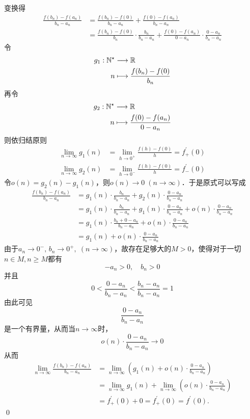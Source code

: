 \prove 变换得
\begin{align}
    \frac{f(b_n)-f(a_n)}{b_n-a_n} &= \frac{f(b_n)-f(0)}{b_n-a_n}+\frac{f(0)-f(a_n)}{b_n-a_n} \\
    &= \frac{f(b_n)-f(0)}{b_n} \cdot \frac{b_n}{b_n - a_n} + \frac{f(0)-f(a_n)}{0 - a_n} \cdot \frac{0 - a_n}{b_n - a_n}
\end{align}
令
\begin{align}
    g_1 : \mathbb{N}^\star &\longrightarrow \mathbb{R} \\
    n &\longmapsto \frac{f(b_n)-f(0)}{b_n}
\end{align}
再令
\begin{align}
    g_2 : \mathbb{N}^\star &\longrightarrow \mathbb{R} \\
    n &\longmapsto \frac{f(0)-f(a_n)}{0-a_n}
\end{align}
则依归结原则
\begin{align}
    \lim_{n \to \infty} g_1(n) &= \lim_{h \to 0^+} \frac{f(h)-f(0)}{h} = f^{\prime}_+(0) \\
    \lim_{n \to \infty} g_2(n) &= \lim_{h \to 0^-} \frac{f(h)-f(0)}{h} = f^{\prime}_-(0)
\end{align}
令$o(n) = g_2(n)-g_1(n)$，则$o(n) \to 0 \; (n \to \infty)$．于是原式可以写成
\begin{align}
    \frac{f(b_n)-f(a_n)}{b_n - a_n} &= g_1(n) \cdot \frac{b_n}{b_n-a_n} + g_2(n) \cdot \frac{0-a_n}{b_n-a_n} \\
    &= g_1(n) \cdot \frac{b_n}{b_n-a_n} + g_1(n) \cdot \frac{0-a_n}{b_n-a_n} + o(n) \cdot \frac{0-a_n}{b_n-a_n} \\
    &=g_1(n) \cdot \frac{b_n + 0 - a_n}{b_n - a_n} + o(n) \cdot \frac{0 - a_n}{b_n - a_n} \\
    &= g_1(n) + o(n) \cdot \frac{0-a_n}{b_n - a_n}
\end{align}
由于$a_n \to 0^-, \, b_n \to 0^+, \; (n \to \infty)$，故存在足够大的$M > 0$，使得对于一切$n \in M, n \geq M$都有
\begin{equation}
    -a_n > 0, \quad b_n > 0
\end{equation}
并且
\begin{equation}
    0 < \frac{0 - a_n}{b_n - a_n} < \frac{b_n - a_n}{b_n - a_n} = 1
\end{equation}
由此可见
\begin{equation}
    \frac{0-a_n}{b_n - a_n}
\end{equation}
是一个有界量，从而当$n \to \infty$时，
\begin{equation}
    o(n) \cdot \frac{0 - a_n}{b_n - a_n} \to 0
\end{equation}
从而
\begin{align}
    \lim_{n \to \infty} \frac{f(b_n)-f(a_n)}{b_n-a_n} &= \lim_{n \to \infty} \left( g_1(n) + o(n) \cdot \frac{0 - a_n}{b_n-a_n}\right) \\
    &= \lim_{n \to \infty} g_1(n) + \lim_{n \to \infty} \left( o(n) \cdot \frac{0 - a_n}{b_n - a_n} \right) \\
    &= f^{\prime}_{+}(0) + 0 = f^{\prime}_{+}(0) = f^{\prime}(0).
\end{align}
\qed\bigskip

